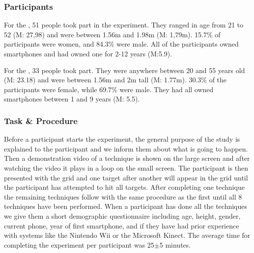 \subsubsection{Participants}
For the \target, 51 people took part in the experiment. They ranged in age from 21 to 52 (M: 27,98) and were between 1.56m and 1.98m (M: 1,79m). 
15.7\% of participants were women, and 84.3\% were male.
All of the participants owned smartphones and had owned one for 2-12 years (M:5.9).

For the \accuracy, 33 people took part. They were anywhere between 20 and 55 years old (M: 23.18) and were between 1.56m and 2m tall (M: 1.77m).
30.3\% of the participants were female, while 69.7\% were male.
They had all owned smartphones between 1 and 9 years (M: 5.5).

\subsubsection{Task \& Procedure} \label{sec:procedure}
Before a participant starts the experiment, the general purpose of the study is explained to the participant and we inform them about what is going to happen.
Then a demonstration video of a technique is shown on the large screen and after watching the video it plays in a loop on the small screen.
The participant is then presented with the grid and one target after another will appear in the grid until the participant has attempted to hit all targets.
After completing one technique the remaining techniques follow with the same procedure as the first until all 8 techniques have been performed.
When a participant has done all the techniques we give them a short demographic questionnaire including age, height, gender, current phone, year of first smartphone, and if they have had prior experience with systems like the Nintendo Wii or the Microsoft Kinect.
The average time for completing the experiment per participant was 25$\pm$5 minutes. 